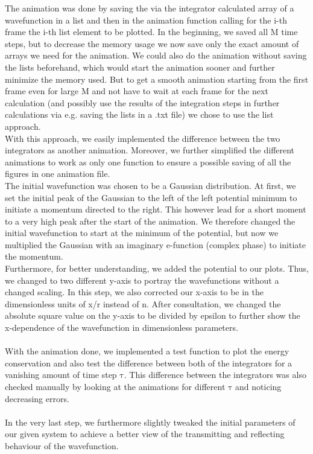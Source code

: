 \documentclass[11pt, letterpaper, onecolumn]{article}
\begin{document}
	The animation was done by saving the via the integrator calculated array of a wavefunction in a list and then in the animation function calling for the i-th frame the i-th list element to be plotted. In the beginning, we saved all M time steps, but to decrease the memory usage we now save only the exact amount of arrays we need for the animation. We could also do the animation without saving the lists beforehand, which would start the animation sooner and further minimize the memory used. But to get a smooth animation starting from the first frame even for large M and not have to wait at each frame for the next calculation (and possibly use the results of the integration steps in further calculations via e.g. saving the lists in a .txt file) we chose to use the list approach. \\
	With this approach, we easily implemented the difference between the two integrators as another animation. Moreover, we further simplified the different animations to work as only one function to ensure a possible saving of all the figures in one animation file. \\
	The initial wavefunction was chosen to be a Gaussian distribution. At first, we set the initial peak of the Gaussian to the left of the left potential minimum to initiate a momentum directed to the right. This however lead for a short moment to a very high peak after the start of the animation. We therefore changed the initial wavefunction to start at the minimum of the potential, but now we multiplied the Gaussian with an imaginary e-function (complex phase) to initiate the momentum.\\
	Furthermore, for better understanding, we added the potential to our plots. Thus, we changed to two different y-axis to portray the wavefunctions without a changed scaling. In this step, we also corrected our x-axis to be in the dimensionless units of x/r instead of n. After consultation, we changed the absolute square value on the y-axis to be divided by epsilon to further show the x-dependence of the wavefunction in dimensionless parameters.
	\\
	\\
	With the animation done, we implemented a test function to plot the energy conservation and also test the difference between both of the integrators for a vanishing amount of time step $\mathrm{\tau}$. This difference between the integrators was also checked manually by looking at the animations for different $\mathrm{\tau}$ and noticing decreasing errors.
	\\
	\\
	In the very last step, we furthermore slightly tweaked the initial parameters of our given system to achieve a better view of the transmitting and reflecting behaviour of the wavefunction. 
\end{document}
